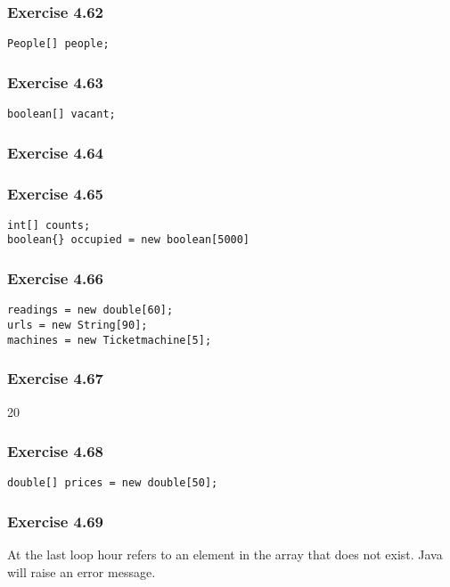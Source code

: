 \subsubsection{Exercise 4.62}
\begin{lstlisting}
People[] people;
\end{lstlisting}

\subsubsection{Exercise 4.63}
\begin{lstlisting}
boolean[] vacant;
\end{lstlisting}

\subsubsection{Exercise 4.64}


\subsubsection{Exercise 4.65}
\begin{lstlisting}
int[] counts; 
boolean{} occupied = new boolean[5000]
\end{lstlisting}

\subsubsection{Exercise 4.66}
\begin{lstlisting}
readings = new double[60];
urls = new String[90];
machines = new Ticketmachine[5];
\end{lstlisting}

\subsubsection{Exercise 4.67}
20

\subsubsection{Exercise 4.68}
\begin{lstlisting}
double[] prices = new double[50];
\end{lstlisting}

\subsubsection{Exercise 4.69}
At the last loop hour refers to an element in the array that does not exist. 
Java will raise an error message. 

